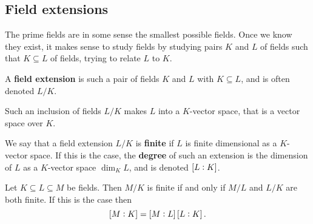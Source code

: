 \subsection{Field extensions}

The prime fields are in some sense the smallest possible fields. Once we know they exist, it makes sense to study fields by studying pairs $ K $ and $ L $ of fields such that $ K \subseteq L $ of fields, trying to relate $ L $ to $ K $.

\begin{definition}
A \textbf{field extension} is such a pair of fields $ K $ and $ L $ with $ K \subseteq L $, and is often denoted $ L / K $.
\end{definition}

\begin{note*}
Such an inclusion of fields $ L / K $ makes $ L $ into a $ K $-vector space, that is a vector space over $ K $.
\end{note*}

\begin{definition}
We say that a field extension $ L / K $ is \textbf{finite} if $ L $ is finite dimensional as a $ K $-vector space. If this is the case, the \textbf{degree} of such an extension is the dimension of $ L $ as a $ K $-vector space $ \dim_K L $, and is denoted $ \sbr{L : K} $.
\end{definition}

\begin{proposition}
Let $ K \subseteq L \subseteq M $ be fields. Then $ M / K $ is finite if and only if $ M / L $ and $ L / K $ are both finite. If this is the case then
$$ \sbr{M : K} = \sbr{M : L}\sbr{L : K}. $$
\end{proposition}

